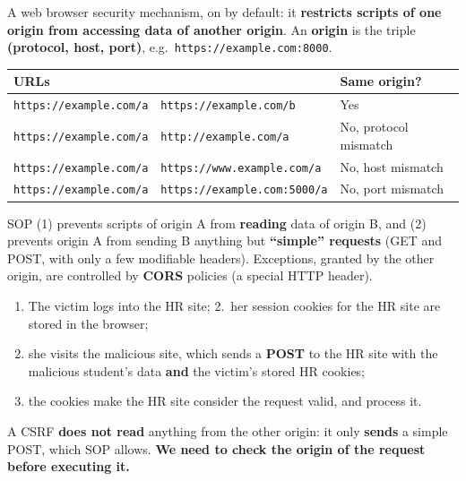 \begin{defnbox}[title={Same Origin Policy (SOP)}]
A web browser security mechanism, on by default: it \textbf{restricts scripts of one origin from
accessing data of another origin}. An \textbf{origin} is the triple \textbf{(protocol, host,
port)}, e.g.\ \texttt{https://example.com:8000}.
\begin{center}
\small
\begin{tabular}{l|l|l}
\multicolumn{2}{l|}{\textbf{URLs}} & \textbf{Same origin?} \\ \hline
\texttt{https://example.com/a} & \texttt{https://example.com/b} & Yes \\
\texttt{https://example.com/a} & \texttt{http://example.com/a} & No, protocol mismatch \\
\texttt{https://example.com/a} & \texttt{https://www.example.com/a} & No, host mismatch \\
\texttt{https://example.com/a} & \texttt{https://example.com:5000/a} & No, port mismatch
\end{tabular}
\end{center}
SOP (1) prevents scripts of origin A from \textbf{reading} data of origin B, and (2) prevents
origin A from sending B anything but \textbf{``simple'' requests} (GET and POST, with only a few
modifiable headers). Exceptions, granted by the other origin, are controlled by \textbf{CORS}
policies (a special HTTP header).
\end{defnbox}

\begin{warnbox}[title={Why SOP does not stop CSRF}]
\begin{enumerate}
  \item The victim logs into the HR site; 2.~her session cookies for the HR site are stored in the
        browser;
  \setcounter{enumi}{2}
  \item she visits the malicious site, which sends a \textbf{POST} to the HR site with the
        malicious student's data \textbf{and} the victim's stored HR cookies;
  \item the cookies make the HR site consider the request valid, and process it.
\end{enumerate}
A CSRF \textbf{does not read} anything from the other origin: it only \textbf{sends} a simple POST,
which SOP allows. \textbf{We need to check the origin of the request before executing it.}
\end{warnbox}

